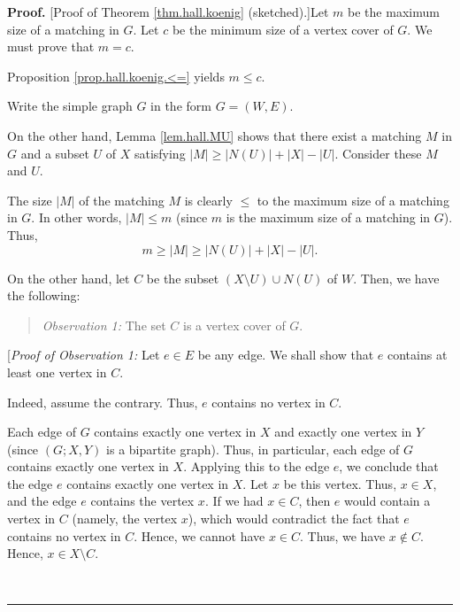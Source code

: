 \documentclass[numbers=enddot,12pt,final,onecolumn,notitlepage]{scrartcl}%
\theoremstyle{definition}
\newenvironment{statement}{\begin{quote}}{\end{quote}}
\newenvironment{proof}[1][Proof]{\noindent\textbf{#1.} }{\ \rule{0.5em}{0.5em}}
\begin{document}
\begin{proof}
[Proof of Theorem \ref{thm.hall.koenig} (sketched).]Let $m$ be the maximum
size of a matching in $G$. Let $c$ be the minimum size of a vertex cover of
$G$. We must prove that $m=c$.

Proposition \ref{prop.hall.koenig.<=} yields $m\leq c$.

Write the simple graph $G$ in the form $G=\left(  W,E\right)  $.

On the other hand, Lemma \ref{lem.hall.MU} shows that there exist a matching
$M$ in $G$ and a subset $U$ of $X$ satisfying $\left\vert M\right\vert
\geq\left\vert N\left(  U\right)  \right\vert +\left\vert X\right\vert
-\left\vert U\right\vert $. Consider these $M$ and $U$.

The size $\left\vert M\right\vert $ of the matching $M$ is clearly $\leq$ to
the maximum size of a matching in $G$. In other words, $\left\vert
M\right\vert \leq m$ (since $m$ is the maximum size of a matching in $G$).
Thus,%
\begin{equation}
m\geq\left\vert M\right\vert \geq\left\vert N\left(  U\right)  \right\vert
+\left\vert X\right\vert -\left\vert U\right\vert .
\label{pf.thm.hall.koenig.m>=}%
\end{equation}


On the other hand, let $C$ be the subset $\left(  X\setminus U\right)  \cup
N\left(  U\right)  $ of $W$. Then, we have the following:

\begin{statement}
\textit{Observation 1:} The set $C$ is a vertex cover of $G$.
\end{statement}

[\textit{Proof of Observation 1:} Let $e\in E$ be any edge. We shall show that
$e$ contains at least one vertex in $C$.

Indeed, assume the contrary. Thus, $e$ contains no vertex in $C$.

Each edge of $G$ contains exactly one vertex in $X$ and exactly one vertex in
$Y$ (since $\left(  G;X,Y\right)  $ is a bipartite graph). Thus, in
particular, each edge of $G$ contains exactly one vertex in $X$. Applying this
to the edge $e$, we conclude that the edge $e$ contains exactly one vertex in
$X$. Let $x$ be this vertex. Thus, $x\in X$, and the edge $e$ contains the
vertex $x$. If we had $x\in C$, then $e$ would contain a vertex in $C$
(namely, the vertex $x$), which would contradict the fact that $e$ contains no
vertex in $C$. Hence, we cannot have $x\in C$. Thus, we have $x\notin C$.
Hence, $x\in X\setminus C$.


\end{proof}
\end{document}
